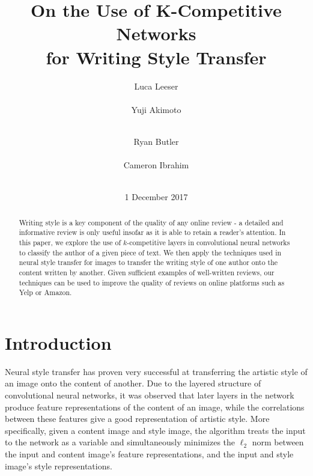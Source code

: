 \documentclass{vldb}
\begin{document}

\title{On the Use of K-Competitive Networks \\ for Writing Style Transfer}



\author{
\alignauthor
Luca Leeser\\
       \\
\alignauthor
Yuji Akimoto\\
       \\
\and
\alignauthor 
Ryan Butler\\
       \\
\alignauthor 
Cameron Ibrahim\\
       \\
}

\date{1 December 2017}

\maketitle

\begin{abstract}
Writing style is a key component of the quality of any online review - a detailed and informative review is only useful insofar as it is able to retain a reader's attention. In this paper, we explore the use of $k$-competitive layers in convolutional neural networks to classify the author of a given piece of text. We then apply the techniques used in neural style transfer for images to transfer the writing style of one author onto the content written by another. Given sufficient examples of well-written reviews, our techniques can be used to improve the quality of reviews on online platforms such as Yelp or Amazon.
\end{abstract}

\section{Introduction}
Neural style transfer \cite{GatysEB15a} has proven very successful at transferring the artistic style of an image onto the content of another. Due to the layered structure of convolutional neural networks, it was observed that later layers in the network produce feature representations of the content of an image, while the correlations between these features give a good representation of artistic style. More specifically, given a content image and style image, the algorithm treats the input to the network as a variable and simultaneously minimizes the $\ell_2$ norm between the input and content image's feature representations, and the input and style image's style representations.
\end{document}

